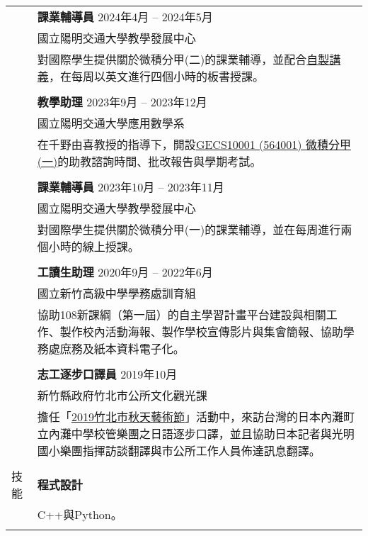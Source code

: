 \documentclass[letterpaper, 11pt]{article}
\begin{document}
\begin{CJK*}{UTF8}{bsmi}
\begin{center}
\begin{longtable}{p{0.72in}p{5.97in}}
        & \textbf{課業輔導員} \hfill 2024年4月 -- 2024年5月 \\
        & 國立陽明交通大學教學發展中心\\
        & 對國際學生提供關於微積分甲(二)的課業輔導，並配合\href{https://github.com/eiken59/2024_II_Tutor}{自製講義}，在每周以英文進行四個小時的板書授課。\\
        & \\

        & \textbf{教學助理} \hfill 2023年9月 -- 2023年12月 \\
        & 國立陽明交通大學應用數學系\\
        & 在千野由喜教授的指導下，開設\href{https://timetable.nycu.edu.tw/?r=main/crsoutline&Acy=112&Sem=1&CrsNo=564001&lang=zh-tw}{GECS10001 (564001) 微積分甲(一)}的助教諮詢時間、批改報告與學期考試。\\
        & \\

        & \textbf{課業輔導員} \hfill 2023年10月 -- 2023年11月 \\
        & 國立陽明交通大學教學發展中心\\
        & 對國際學生提供關於微積分甲(一)的課業輔導，並在每周進行兩個小時的線上授課。\\
        & \\
        
        & \textbf{工讀生助理} \hfill 2020年9月 -- 2022年6月 \\
        & 國立新竹高級中學學務處訓育組\\
        & 協助108新課綱（第一屆）的自主學習計畫平台建設與相關工作、製作校內活動海報、製作學校宣傳影片與集會簡報、協助學務處庶務及紙本資料電子化。\\
        & \\

        & \textbf{志工逐步口譯員} \hfill 2019年10月\\
        & 新竹縣政府竹北市公所文化觀光課\\
        & 擔任「\href{https://www.chupei.gov.tw/travel/p2_1_2.php?bigact_id=111}{2019竹北市秋天藝術節}」活動中，來訪台灣的日本內灘町立內灘中學校管樂團之日語逐步口譯，並且協助日本記者與光明國小樂團指揮訪談翻譯與市公所工作人員佈達訊息翻譯。\\
        & \\
        
        
        {\textcolor{OliveGreen}{技能}} 
        & \textbf{程式設計}\\
        & C++與Python。 \\
        & \\
        

\end{longtable}
\end{center}
\end{CJK*}
\end{document}
